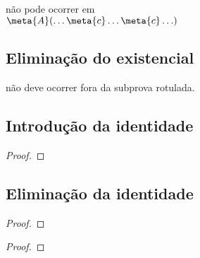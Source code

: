 \begin{multicols}{2}
\medskip\begin{raggedright}
{\small \noindent {} não pode ocorrer em\\ $\meta{A}(\ldots \meta{c} \ldots \meta{c}\ldots)$}
\end{raggedright}

\subsection*{Eliminação do existencial}

%

\begin{fitchproof}
	\open	
	\close
	 
\end{fitchproof}
\medskip\begin{raggedright}
{\small \noindent {} não deve ocorrer fora da subprova rotulada.}
\end{raggedright}\vfill\columnbreak

\end{multicols}

\subsection*{Introdução da identidade}

\begin{proof}
	 
\end{proof}


\subsection*{Eliminação da identidade}

\begin{multicols}{2}
\begin{proof}
	 
\end{proof}
\begin{proof}
	 
\end{proof}
\end{multicols}

